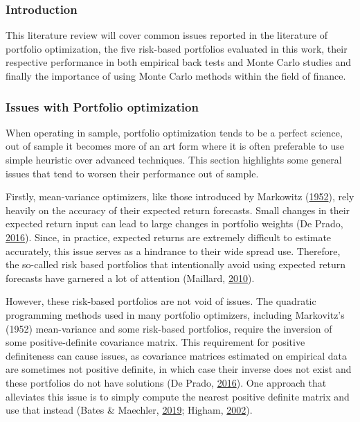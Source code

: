 \documentclass[11pt,preprint, authoryear]{elsarticle}
\numberwithin{equation}{section}
\numberwithin{figure}{section}
\numberwithin{table}{section}
\begin{document}
\hypertarget{introduction-1}{%
\subsubsection{Introduction}\label{introduction-1}}

This literature review will cover common issues reported in the
literature of portfolio optimization, the five risk-based portfolios
evaluated in this work, their respective performance in both empirical
back tests and Monte Carlo studies and finally the importance of using
Monte Carlo methods within the field of finance.

\hypertarget{issues-with-portfolio-optimization}{%
\subsubsection{Issues with Portfolio
optimization}\label{issues-with-portfolio-optimization}}

When operating in sample, portfolio optimization tends to be a perfect
science, out of sample it becomes more of an art form where it is often
preferable to use simple heuristic over advanced techniques. This
section highlights some general issues that tend to worsen their
performance out of sample.

Firstly, mean-variance optimizers, like those introduced by Markowitz
(\protect\hyperlink{ref-markowitz}{1952}), rely heavily on the accuracy
of their expected return forecasts. Small changes in their expected
return input can lead to large changes in portfolio weights (De Prado,
\protect\hyperlink{ref-lopez}{2016}). Since, in practice, expected
returns are extremely difficult to estimate accurately, this issue
serves as a hindrance to their wide spread use. Therefore, the so-called
risk based portfolios that intentionally avoid using expected return
forecasts have garnered a lot of attention (Maillard,
\protect\hyperlink{ref-maillard2010}{2010}).

However, these risk-based portfolios are not void of issues. The
quadratic programming methods used in many portfolio optimizers,
including Markovitz's (1952) mean-variance and some risk-based
portfolios, require the inversion of some positive-definite covariance
matrix. This requirement for positive definiteness can cause issues, as
covariance matrices estimated on empirical data are sometimes not
positive definite, in which case their inverse does not exist and these
portfolios do not have solutions (De Prado,
\protect\hyperlink{ref-lopez}{2016}). One approach that alleviates this
issue is to simply compute the nearest positive definite matrix and use
that instead (Bates \& Maechler, \protect\hyperlink{ref-Matrix}{2019};
Higham, \protect\hyperlink{ref-higham2002}{2002}).
\end{document}
